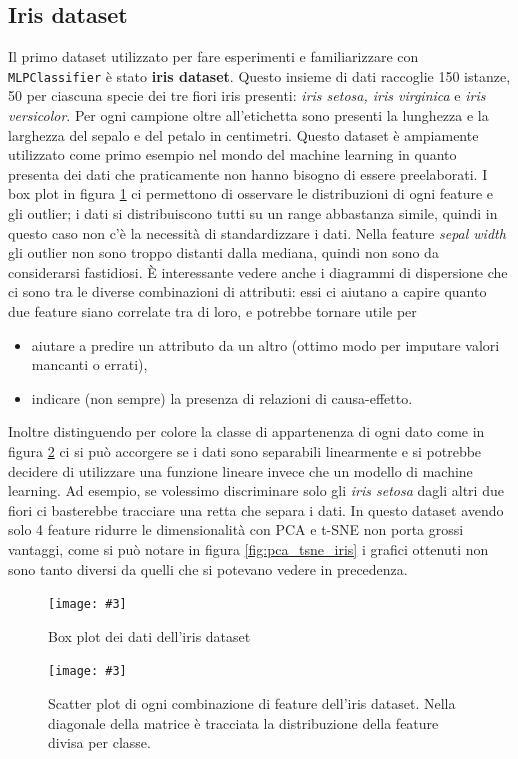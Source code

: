 \documentclass[12pt, twoside, letterpaper]{report}
\newcommand{\img}[4] {
	\begin{figure}
		\centering
		\texttt{[image: \#3]}\\
		\caption{#1}
		\label{fig:#4}
	\end{figure}
}
\begin{document}
		\subsection{Iris dataset}
			Il primo dataset utilizzato per fare esperimenti e familiarizzare con \texttt{MLPClassifier} è stato \textbf{iris dataset}. Questo insieme di dati raccoglie 150 istanze, 50 per ciascuna specie dei tre fiori iris presenti: \textit{iris setosa, iris virginica} e \textit{iris versicolor}. Per ogni campione oltre all'etichetta sono presenti la lunghezza e la larghezza del sepalo e del petalo in centimetri. Questo dataset è ampiamente utilizzato come primo esempio nel mondo del machine learning in quanto presenta dei dati che praticamente non hanno bisogno di essere preelaborati. I box plot in figura \ref{fig:boxplot_iris} ci permettono di osservare le distribuzioni di ogni feature e gli outlier; i dati si distribuiscono tutti su un range abbastanza simile, quindi in questo caso non c'è la necessità di standardizzare i dati. Nella feature \textit{sepal width} gli outlier non sono troppo distanti dalla mediana, quindi non sono da considerarsi fastidiosi. È interessante vedere anche i diagrammi di dispersione che ci sono tra le diverse combinazioni di attributi: essi ci aiutano a capire quanto due feature siano correlate tra di loro, e potrebbe tornare utile per
			\begin{itemize}
				\item aiutare a predire un attributo da un altro (ottimo modo per imputare valori mancanti o errati),
				\item indicare (non sempre) la presenza di relazioni di causa-effetto.
			\end{itemize}
			Inoltre distinguendo per colore la classe di appartenenza di ogni dato come in figura \ref{fig:scatter_iris}  ci si può accorgere se i dati sono separabili linearmente e si potrebbe decidere di utilizzare una funzione lineare invece che un modello di machine learning. Ad esempio, se volessimo discriminare solo gli \textit{iris setosa} dagli altri due fiori ci basterebbe tracciare una retta che separa i dati. In questo dataset avendo solo 4 feature ridurre le dimensionalità con PCA e t-SNE non porta grossi vantaggi, come si può notare in figura \ref{fig:pca_tsne_iris} i grafici ottenuti non sono tanto diversi da quelli che si potevano vedere in precedenza.
			
			\img{Box plot dei dati dell'iris dataset}{0.5}{boxplot.png}{boxplot_iris}
			\img{Scatter plot di ogni combinazione di feature dell'iris dataset. Nella diagonale della matrice è tracciata la distribuzione della feature divisa per classe.}{0.6}{scatter.png}{scatter_iris}
			
\end{document}
